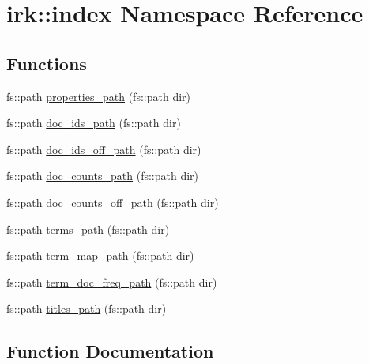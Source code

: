 \hypertarget{namespaceirk_1_1index}{}\section{irk\+:\+:index Namespace Reference}
\label{namespaceirk_1_1index}
\subsection*{Functions}
\begin{DoxyCompactItemize}
\item 
fs\+::path \mbox{\hyperlink{namespaceirk_1_1index_a5880f03dd72d6ebbae004d2ab83c219e}{properties\+\_\+path}} (fs\+::path dir)
\item 
fs\+::path \mbox{\hyperlink{namespaceirk_1_1index_a1680416c227181a5ab2f0b0169adb11e}{doc\+\_\+ids\+\_\+path}} (fs\+::path dir)
\item 
fs\+::path \mbox{\hyperlink{namespaceirk_1_1index_aae22e4280b8fc44a46c81159429bf889}{doc\+\_\+ids\+\_\+off\+\_\+path}} (fs\+::path dir)
\item 
fs\+::path \mbox{\hyperlink{namespaceirk_1_1index_aee9cb8e5de7bc61fdc17458d5b597e04}{doc\+\_\+counts\+\_\+path}} (fs\+::path dir)
\item 
fs\+::path \mbox{\hyperlink{namespaceirk_1_1index_a5f8f21506f18df93a60b7ff061a800df}{doc\+\_\+counts\+\_\+off\+\_\+path}} (fs\+::path dir)
\item 
fs\+::path \mbox{\hyperlink{namespaceirk_1_1index_a003bce4c8d885ec3e8ffffd7dc53222f}{terms\+\_\+path}} (fs\+::path dir)
\item 
fs\+::path \mbox{\hyperlink{namespaceirk_1_1index_aa8e9c3cb825736431f0f63ca2b380da3}{term\+\_\+map\+\_\+path}} (fs\+::path dir)
\item 
fs\+::path \mbox{\hyperlink{namespaceirk_1_1index_a616162aee34d0fe0460174bab4e8e518}{term\+\_\+doc\+\_\+freq\+\_\+path}} (fs\+::path dir)
\item 
fs\+::path \mbox{\hyperlink{namespaceirk_1_1index_a2c4aa814da3f9412179fe44a70fdbe94}{titles\+\_\+path}} (fs\+::path dir)
\end{DoxyCompactItemize}


\subsection{Function Documentation}
\mbox{\label{namespaceirk_1_1index_a5f8f21506f18df93a60b7ff061a800df}} 

